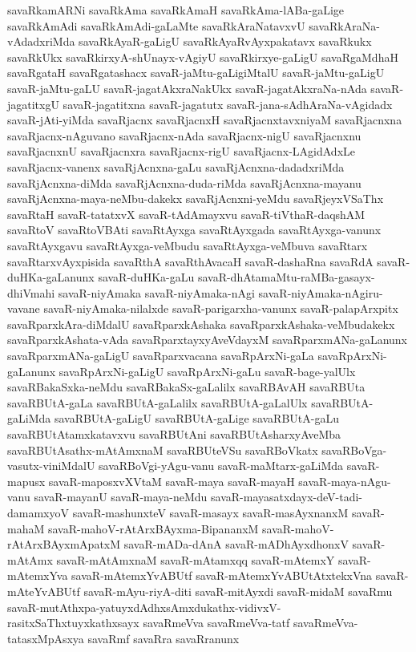{savaRkamARNi
savaRkAma
savaRkAmaH
savaRkAma-lABa-gaLige
savaRkAmAdi
savaRkAmAdi-gaLaMte
savaRkAraNatavxvU
savaRkAraNa-vAdadxriMda
savaRkAyaR-gaLigU
savaRkAyaRvAyxpakatavx
savaRkukx
savaRkUkx
savaRkirxyA-shUnayx-vAgiyU
savaRkirxye-gaLigU
savaRgaMdhaH
savaRgataH
savaRgatashacx
savaR-jaMtu-gaLigiMtalU
savaR-jaMtu-gaLigU
savaR-jaMtu-gaLU
savaR-jagatAkxraNakUkx
savaR-jagatAkxraNa-nAda
savaR-jagatitxgU
savaR-jagatitxna
savaR-jagatutx
savaR-jana-sAdhAraNa-vAgidadx
savaR-jAti-yiMda
savaRjacnx
savaRjacnxH
savaRjacnxtavxniyaM
savaRjacnxna
savaRjacnx-nAguvano
savaRjacnx-nAda
savaRjacnx-nigU
savaRjacnxnu
savaRjacnxnU
savaRjacnxra
savaRjacnx-rigU
savaRjacnx-LAgidAdxLe
savaRjacnx-vanenx
savaRjAcnxna-gaLu
savaRjAcnxna-dadadxriMda
savaRjAcnxna-diMda
savaRjAcnxna-duda-riMda
savaRjAcnxna-mayanu
savaRjAcnxna-maya-neMbu-dakekx
savaRjAcnxni-yeMdu
savaRjeyxVSaThx
savaRtaH
savaR-tatatxvX
savaR-tAdAmayxvu
savaR-tiVthaR-daqshAM
savaRtoV
savaRtoVBAti
savaRtAyxga
savaRtAyxgada
savaRtAyxga-vanunx
savaRtAyxgavu
savaRtAyxga-veMbudu
savaRtAyxga-veMbuva
savaRtarx
savaRtarxvAyxpisida
savaRthA
savaRthAvacaH
savaR-dashaRna
savaRdA
savaR-duHKa-gaLanunx
savaR-duHKa-gaLu
savaR-dhAtamaMtu-raMBa-gasayx-dhiVmahi
savaR-niyAmaka
savaR-niyAmaka-nAgi
savaR-niyAmaka-nAgiru-vavane
savaR-niyAmaka-nilalxde
savaR-parigarxha-vanunx
savaR-palapArxpitx
savaRparxkAra-diMdalU
savaRparxkAshaka
savaRparxkAshaka-veMbudakekx
savaRparxkAshata-vAda
savaRparxtayxyAveVdayxM
savaRparxmANa-gaLanunx
savaRparxmANa-gaLigU
savaRparxvacana
savaRpArxNi-gaLa
savaRpArxNi-gaLanunx
savaRpArxNi-gaLigU
savaRpArxNi-gaLu
savaR-bage-yalUlx
savaRBakaSxka-neMdu
savaRBakaSx-gaLalilx
savaRBAvAH
savaRBUta
savaRBUtA-gaLa
savaRBUtA-gaLalilx
savaRBUtA-gaLalUlx
savaRBUtA-gaLiMda
savaRBUtA-gaLigU
savaRBUtA-gaLige
savaRBUtA-gaLu
savaRBUtAtamxkatavxvu
savaRBUtAni
savaRBUtAsharxyAveMba
savaRBUtAsathx-mAtAmxnaM
savaRBUteVSu
savaRBoVkatx
savaRBoVga-vasutx-viniMdalU
savaRBoVgi-yAgu-vanu
savaR-maMtarx-gaLiMda
savaR-mapusx
savaR-maposxvXVtaM
savaR-maya
savaR-mayaH
savaR-maya-nAgu-vanu
savaR-mayanU
savaR-maya-neMdu
savaR-mayasatxdayx-deV-tadi-damamxyoV
savaR-mashunxteV
savaR-masayx
savaR-masAyxnanxM
savaR-mahaM
savaR-mahoV-rAtArxBAyxma-BipananxM
savaR-mahoV-rAtArxBAyxmApatxM
savaR-mADa-dAnA
savaR-mADhAyxdhonxV
savaR-mAtAmx
savaR-mAtAmxnaM
savaR-mAtamxqq
savaR-mAtemxY
savaR-mAtemxYva
savaR-mAtemxYvABUtf
savaR-mAtemxYvABUtAtxtekxVna
savaR-mAteYvABUtf
savaR-mAyu-riyA-diti
savaR-mitAyxdi
savaR-midaM
savaRmu
savaR-mutAthxpa-yatuyxdAdhxsAmxdukathx-vidivxV-rasitxSaThxtuyxkathxsayx
savaRmeVva
savaRmeVva-tatf
savaRmeVva-tatasxMpAsxya
savaRmf
savaRra
savaRranunx
}
